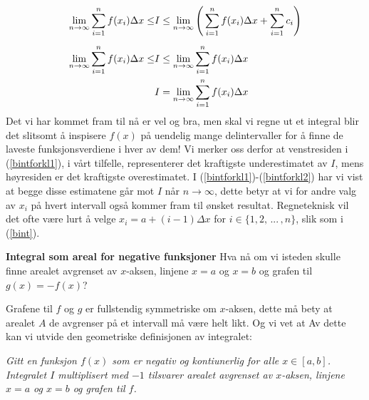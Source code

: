 {\begin{align}
\lim\limits_{n\to\infty}\sum\limits_{i=1}^{n} f(x_i)\Delta x \leq &I \leq \lim\limits_{n\to\infty}\left(\,\sum\limits_{i=1}^{n} f(x_i)\Delta x+ \sum\limits_{i=1}^{n} c_i\right) \label{bintforkl1} \br
\lim\limits_{n\to\infty}\sum\limits_{i=1}^{n} f(x_i)\Delta x \leq &I\leq \lim\limits_{n\to\infty}\sum\limits_{i=1}^{n} f(x_i)\Delta x \\
&I= \lim\limits_{n\to\infty}\sum\limits_{i=1}^{n} f(x_i)\Delta x	\label{bintforkl2}
\end{align}
Det vi har kommet fram til nå er vel og bra, men skal vi regne ut et integral blir det slitsomt å inspisere $ f(x) $ på uendelig mange delintervaller for å finne de laveste funksjonsverdiene i hver av dem! Vi merker oss derfor at venstresiden i (\ref{bintforkl1}), i vårt tilfelle, representerer det kraftigste underestimatet av $ I $, mens høyresiden er det kraftigste overestimatet. I (\ref{bintforkl1})-(\ref{bintforkl2}) har vi vist at begge disse estimatene går mot $ I $ når $ {n\to\infty} $, dette betyr at vi for andre valg av $ x_i $ på hvert intervall også kommer fram til ønsket resultat. Regneteknisk vil det ofte være lurt å velge $ x_i=a+(i-1)\Delta x $ for $ {i\in\lbrace 1, 2,\,...\,, n\rbrace} $, slik som i (\ref{bint}).\vsk

\textbf{Integral som areal for negative funksjoner}\bs
Hva nå om vi isteden skulle finne arealet avgrenset av $ x $-aksen, linjene $ {x=a} $ og $ {x= b }$ og grafen til $ {g(x) = -f(x)} $? \vsk

Grafene til $ f $ og $ g $ er fullstendig symmetriske om $ x$-aksen, dette må bety at arealet $ A $ de avgrenser på et intervall må være helt likt. Og vi vet at\vs
{}
Av dette kan vi utvide den geometriske definisjonen av integralet:\vsk

\textsl{Gitt en funksjon $ f(x) $ som er negativ og kontiunerlig for alle $ {x\in[a, b] }$. Integralet $ I $ multiplisert med $ -1 $ tilsvarer arealet avgrenset av $ x $-aksen, linjene $ {x=a} $ og ${ x= b} $ og grafen til $ f $.}
\label{bintslutt}
} \vsk

